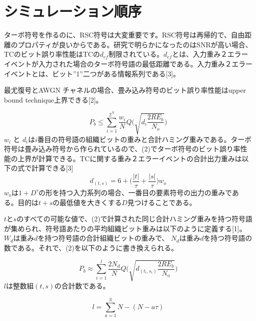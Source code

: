 \documentclass[20 pts]{article}
\begin{document}
\section{シミュレーション順序}
ターボ符号を作るのに、RSC符号は大変重要です。RSC符号は再帰的で、自由距離のプロパティが良いからである。研究で明らかになったのはSNRが高い場合、TCのビット誤り率性能はTCの$d_{ef}$制限されている。$d_{ef}$とは、入力重み２エラーイベントが入力された場合のターボ符号語の最低距離である。入力重み２エラーイベントとは、ビット''1''二つがある情報系列である[3]。

最尤復号とAWGN チャネルの場合、畳み込み符号のビット誤り率性能はupper bound technique上界できる[2]。


\begin{equation}
P_b \leq \sum_{i=1}^{2^N} \frac{w_i}{N}Q\Bigg( \sqrt{d_i\frac{2RE_b}{N_o}}\Bigg)
\end{equation}
 $w_i$ と $d_i$は$i$番目の符号語の組織ビットの重みと合計ハミング重みである。ターボ符号は畳み込み符号から作られているので、(2)でターボ符号のビット誤り率性能の上界が計算できる。TCに関する重み２エラーイベントの合計出力重みは以下の式で計算できる[3]
\begin{equation}
d_{(t,s)}=6+\Bigg( \frac{ \left|t\right|}{\tau} + \frac{ \left|s\right|}{\tau} \Bigg)w_o
\end{equation}
$w_o$は$1+D^\tau$の形を持つ入力系列の場合、一番目の要素符号の出力の重みである。目的は$t+s$の最低値を大きくする$D$見つけることである。

$t$と$s$のすべての可能な値で、(2)で計算された同じ合計ハミング重みを持つ符号語が集められ、符号語あたりの平均組織ビット重みは以下のように定義する[1]。
$W_d$は重み$d$を持つ符号語の合計組織ビットの重みで、 $N_d$は重み$d$を持つ符号語の数である。それで、(2)を以下のように書き換えられる。


\begin{equation}
P_b \approx \sum_{i=1}^{l} \frac{2N_d}{N}Q\Bigg( \sqrt{d_{(t_i,s_i)}\frac{2RE_b}{N_o}}\Bigg)
\end{equation}
$l$は整数組$(t,s)$の合計数である。

$$l=\sum_{a=1}^{3}N-(N-a\tau)$$
\end{document}
